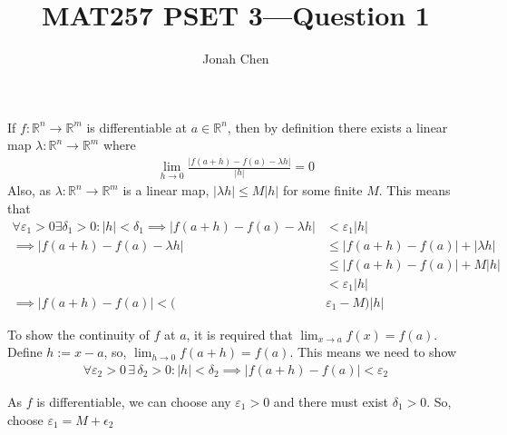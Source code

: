 \documentclass{exam}
\title{MAT257 PSET 3---Question 1}
\author{Jonah Chen}
\numberwithin{equation}{section}
\newcommand{\R}{\mathbb{R}}
\begin{document}
    \sffamily
    \maketitle
    If $f:\R^n\to\R^m$ is differentiable at $a\in\R^n$, then by definition there exists a linear map $\lambda:\R^n\to\R^m$ where
    \begin{align*}
        \lim_{h\to 0}\frac{|f(a+h)-f(a)-\lambda h|}{|h|}=0
    \end{align*}
    Also, as $\lambda:\R^n\to\R^m$ is a linear map, $|\lambda h|\leq M|h|$ for some finite $M$. This means that 
    \begin{align*}
        \forall\varepsilon_1>0\exists\delta_1>0:|h|<\delta_1\implies|f(a+h)-f(a)-\lambda h|&<\varepsilon_1|h|\\
        \implies|f(a+h)-f(a)-\lambda h|&\leq|f(a+h)-f(a)|+|\lambda h|\\
        &\leq|f(a+h)-f(a)|+M|h|\\
        &<\varepsilon_1|h|\\
        \implies |f(a+h)-f(a)|<(&\varepsilon_1-M)|h|
    \end{align*}

    To show the continuity of $f$ at $a$, it is required that $\lim_{x\to a}f(x)=f(a)$. Define $h:=x-a$, so, $\lim_{h\to 0}f(a+h)=f(a)$. This means we need to show
    \begin{align*}
        \forall\varepsilon_2>0\,\exists\,\delta_2>0:|h|<\delta_2\implies |f(a+h)-f(a)|<\varepsilon_2
    \end{align*}

    As $f$ is differentiable, we can choose any $\varepsilon_1>0$ and there must exist $\delta_1>0$. So, choose $\varepsilon_1=M+\epsilon_2$


    
\end{document}
